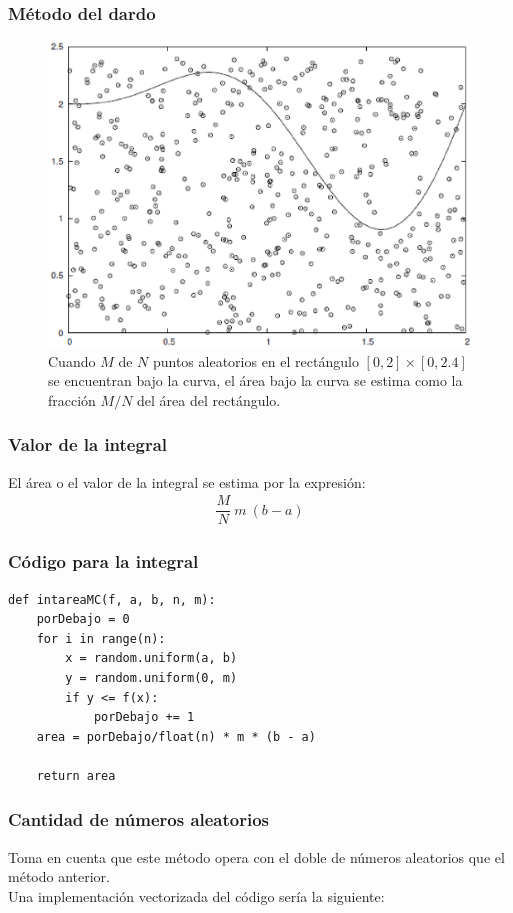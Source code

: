 \documentclass[12pt]{beamer}
\begin{document}
\begin{frame}
\frametitle{Método del dardo}
\begin{figure}
	\centering
	\includegraphics[scale=0.4]{Imagenes/integracionCaja.eps}
	\caption{\tiny{Cuando $M$ de $N$ puntos aleatorios en el rectángulo $[0, 2] \times [0, 2.4]$ se encuentran bajo la curva, el área bajo la curva se estima como la fracción $M / N$ del área del rectángulo.}}
\end{figure}
\end{frame}
\begin{frame}
\frametitle{Valor de la integral}
El área o el valor de la integral se estima por la expresión:
\pause
\begin{align*}
\dfrac{M}{N} \: m \: (b - a)
\end{align*}
\end{frame}
\begin{frame}
\frametitle{Código para la integral}
\begin{lstlisting}[caption=Código para el método del dardo]
def intareaMC(f, a, b, n, m):
    porDebajo = 0 
    for i in range(n):
        x = random.uniform(a, b)
        y = random.uniform(0, m)
        if y <= f(x):
            porDebajo += 1
    area = porDebajo/float(n) * m * (b - a)
    
    return area
\end{lstlisting}
\end{frame}
\begin{frame}[fragile]
\frametitle{Cantidad de números aleatorios}
Toma en cuenta que este método opera con el doble de números aleatorios que el método anterior.
\\
\bigskip
\pause
Una implementación vectorizada del código sería la siguiente:
\end{frame}
\end{document}
